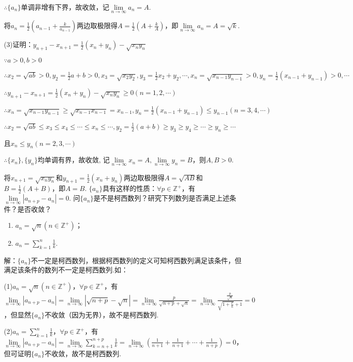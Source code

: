 \documentclass[12pt,UTF8]{ctexart}
\begin{document}
\begin{enumerate}
$\therefore\{a_n\}$单调非增有下界，故收敛，记$\lim\limits_{n\rightarrow\infty}a_n=A$.

将$a_n=\frac12(a_{n-1}+\frac k{a_{n-1}})$两边取极限得$A=\frac12(A+\frac kA)$，即$\lim\limits_{n\rightarrow\infty}a_n=A=\sqrt k$.

(3)证明：$y_{n+1}-x_{n+1}=\frac12(x_n+y_n)-\sqrt{x_ny_n}$

$\because a>0,b>0$

$\therefore x_2=\sqrt{ab}>0,y_2=\frac12{a+b}>0,x_3=\sqrt{x_2y_2},y_3=\frac12{x_2+y_2},\cdots,x_n=\sqrt{x_{n-1}y_{n-1}}>0,y_n=\frac12(x_{n-1}+y_{n-1})>0,\cdots$

$\therefore y_{n+1}-x_{n+1}=\frac12(x_n+y_n)-\sqrt{x_ny_n}\geq0(n=1,2,\cdots)$

$\therefore x_n=\sqrt{x_{n-1}y_{n-1}}\geq\sqrt{x_{n-1}x_{n-1}}=x_{n-1},y_n=\frac12(x_{n-1}+y_{n-1})\leq y_{n-1}(n=3,4,\cdots)$

$\therefore x_2=\sqrt{ab}\leq x_3\leq x_4\leq\cdots\leq x_n\leq\cdots,y_2=\frac12(a+b)\geq y_3\geq y_4\geq\cdots\geq y_n\geq\cdots$

且$x_n\leq y_n(n=2,3,\cdots)$

$\therefore\{x_n\},\{y_n\}$均单调有界，故收敛, 记$\lim\limits_{n\rightarrow\infty}x_n=A,\lim\limits_{n\rightarrow\infty}y_n=B$，则$A,B>0$.

将$x_{n+1}=\sqrt{x_ny_n}$和$y_{n+1}=\frac12(x_n+y_n)$两边取极限得$A=\sqrt{AB}$和$B=\frac12(A+B)$，即$A=B$.
$\{a_n\}$具有这样的性质：$\forall p\in\mathbb Z^+$，有$\lim\limits_{n\rightarrow\infty}|a_{n+p}-a_n|=0$. 问$\{a_n\}$是不是柯西数列？研究下列数列是否满足上述条件？是否收敛？
\begin{enumerate}[(1)]
	\item$a_n=\sqrt n(n\in\mathbb Z^+)$；
	\item$a_n=\sum_{k=1}^{n}\frac1k$.
\end{enumerate}
解：$\{a_n\}$不一定是柯西数列，根据柯西数列的定义可知柯西数列满足该条件，但满足该条件的数列不一定是柯西数列.如： 

(1)$a_n=\sqrt n(n\in\mathbb Z^+)$，$\forall p\in\mathbb Z^+$，有$\lim\limits_{n\rightarrow\infty}|a_{n+p}-a_n|=\lim\limits_{n\rightarrow\infty}|\sqrt{n+p}-\sqrt n|=\lim\limits_{n\rightarrow\infty}\frac p{\sqrt{n+p}+\sqrt n}=\lim\limits_{n\rightarrow\infty}\frac {\frac p{\sqrt n}}{\sqrt{1+\frac p{n}}+1}=0$，但显然$\{a_n\}$不收敛（因为无界），故不是柯西数列.

(2)$a_n=\sum_{k=1}^{n}\frac1k$，$\forall p\in\mathbb Z^+$，有$\lim\limits_{n\rightarrow\infty}|a_{n+p}-a_n|=\lim\limits_{n\rightarrow\infty}\sum_{k=n+1}^{n+p}\frac1k=\lim\limits_{n\rightarrow\infty}(\frac1{n+1}+\frac1{n+1}+\cdots+\frac1{n+p})=0$，但可证明$\{a_n\}$不收敛，故不是柯西数列.


\end{enumerate}
\end{document}
